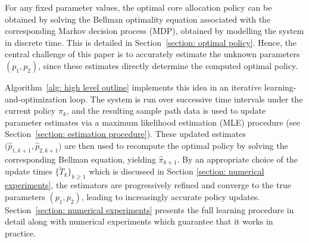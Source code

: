 \documentclass[11pt]{article}
\newcommand{\jp}[1]{\footnote{J-P: #1}}
\theoremstyle{remark}
\newtheorem{remark}[thm]{Remark}
\theoremstyle{definition}
\numberwithin{equation}{section}
\begin{document}
For any fixed parameter values, the optimal core allocation policy can be obtained by solving the Bellman optimality equation associated with the corresponding Markov decision process (MDP), obtained by modelling the system in discrete time. This is detailed in Section~\ref{section: optimal policy}. Hence, the central challenge of this paper is to accurately estimate the unknown parameters $(p_1,p_2)$, since these estimates directly determine the computed optimal policy.

Algorithm~\ref{alg: high level outline} implements this idea in an iterative learning-and-optimization loop. The system is run over successive time intervals under the current policy $\pi_k$, and the resulting sample path data is used to update parameter estimates via a maximum likelihood estimation (MLE) procedure (see Section~\ref{section: estimation procedure}). These updated estimates $\big(\widehat{p}_{1,k+1}, \widehat{p}_{2,k+1}\big)$ are then used to recompute the optimal policy by solving the corresponding Bellman equation, yielding $\widehat{\pi}_{k+1}$.
By an appropriate choice of the update times $\big\{\widetilde{T}_k\big\}_{k \ge 1}$ which is discussed in Section \ref{section: numerical experiments}, the estimators are progressively refined and converge to the true parameters $(p_1,p_2)$, leading to increasingly accurate policy updates. 
Section~\ref{section: numerical experiments} presents the full learning procedure in detail along with numerical experiments which guarantee that it works in practice.





\end{document}
